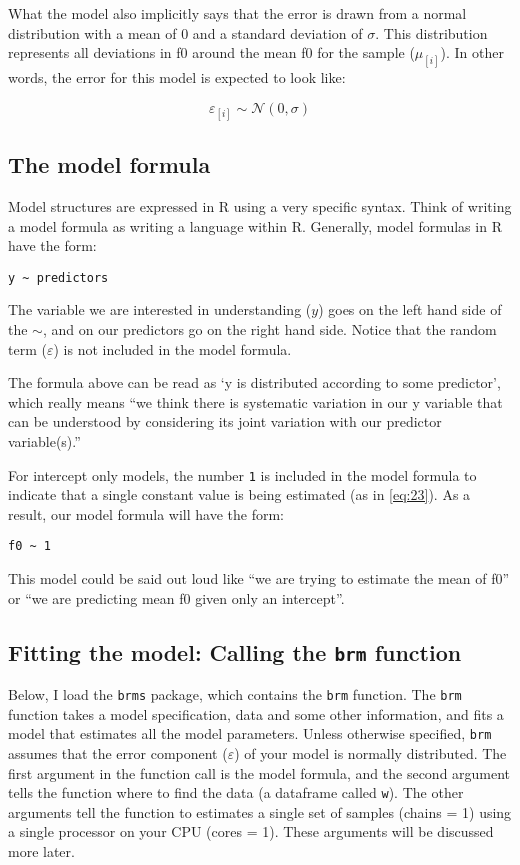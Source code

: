 \documentclass[
]{book}
\begin{document}
What the model also implicitly says that the error is drawn from a normal distribution with a mean of 0 and a standard deviation of \(\sigma\). This distribution represents all deviations in f0 around the mean f0 for the sample (\(\mu_{[i]}\)). In other words, the error for this model is expected to look like:

\[
\varepsilon_{[i]} \sim \mathcal{N}(0,\sigma)
\label{eq:25}
\]

\hypertarget{the-model-formula}{%
\subsection{The model formula}\label{the-model-formula}}

Model structures are expressed in R using a very specific syntax. Think of writing a model formula as writing a language within R. Generally, model formulas in R have the form:

\texttt{y\ \textasciitilde{}\ predictors}

The variable we are interested in understanding (\(y\)) goes on the left hand side of the \(\sim\), and on our predictors go on the right hand side. Notice that the random term (\(\varepsilon\)) is not included in the model formula.

The formula above can be read as `y is distributed according to some predictor', which really means ``we think there is systematic variation in our y variable that can be understood by considering its joint variation with our predictor variable(s).''

For intercept only models, the number \texttt{1} is included in the model formula to indicate that a single constant value is being estimated (as in \eqref{eq:23}). As a result, our model formula will have the form:

\texttt{f0\ \textasciitilde{}\ 1}

This model could be said out loud like ``we are trying to estimate the mean of f0'' or ``we are predicting mean f0 given only an intercept''.

\hypertarget{fitting-the-model-calling-the-brm-function}{%
\subsection{\texorpdfstring{Fitting the model: Calling the \texttt{brm} function}{Fitting the model: Calling the brm function}}\label{fitting-the-model-calling-the-brm-function}}

Below, I load the \texttt{brms} package, which contains the \texttt{brm} function. The \texttt{brm} function takes a model specification, data and some other information, and fits a model that estimates all the model parameters. Unless otherwise specified, \texttt{brm} assumes that the error component (\(\varepsilon\)) of your model is normally distributed. The first argument in the function call is the model formula, and the second argument tells the function where to find the data (a dataframe called \texttt{w}). The other arguments tell the function to estimates a single set of samples (chains = 1) using a single processor on your CPU (cores = 1). These arguments will be discussed more later.
\end{document}
